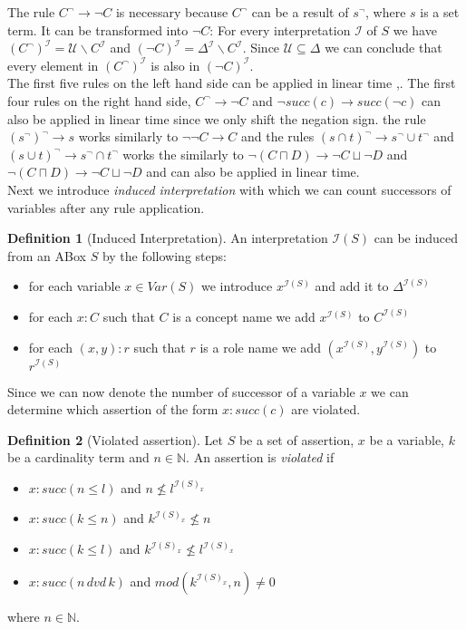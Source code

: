 \documentclass[a4paper,11pt]{scrartcl}
\theoremstyle{break}
\theoremstyle{definition}
\newtheorem{mydef}{Definition}
\begin{document}
The rule $C^\neg\rightarrow \neg C$ is necessary because $C^\neg$ can be a result of $s^\neg$, where $s$ is a set term. It can be transformed into $\neg C$: For every interpretation $\mathcal{I}$ of $S$ we have $(C^\neg)^\mathcal{I}=\mathcal{U}\backslash C^\mathcal{I}$ and $(\neg C)^\mathcal{I}=\Delta^\mathcal{I}\backslash C^\mathcal{I}$. Since $\mathcal{U}\subseteq \Delta$ we can conclude that every element in $(C^\neg)^\mathcal{I}$ is also in $(\neg C)^\mathcal{I}$.\\
The first five rules on the left hand side can be applied in linear time \cite{1},\cite{6}. The first four rules on the right hand side, $C^\neg\rightarrow \neg C$ and $\neg succ(c)\rightarrow succ(\neg c)$ can also be applied in linear time since we only shift the negation sign. the rule $(s^\neg)^\neg\rightarrow s$ works similarly to $\neg\neg C\rightarrow C$ and the rules $(s\cap t)^\neg\rightarrow s^\neg\cup t^\neg$ and $(s\cup t)^\neg\rightarrow s^\neg \cap t^\neg$ works the similarly to $\neg(C\sqcap D)\rightarrow \neg C\sqcup \neg D$ and $\neg(C\sqcap D)\rightarrow \neg C\sqcup \neg D$ and can also be applied in linear time.\\
Next we introduce \textit{induced interpretation} with which we can count successors of variables after any rule application.
\begin{mydef}[Induced Interpretation]
An interpretation $\mathcal{I}(S)$ can be induced from an ABox $S$ by the following steps:
\begin{itemize}
\item for each variable $x\in Var(S)$ we introduce $x^{\mathcal{I}(S)}$ and add it to $\Delta^{\mathcal{I}(S)}$
\item for each $x:C$ such that $C$ is a concept name we add $x^{\mathcal{I}(S)}$ to $C^{\mathcal{I}(S)}$
\item for each $(x,y):r$ such that $r$ is a role name we add $(x^{\mathcal{I}(S)},y^{\mathcal{I}(S)})$ to $r^{\mathcal{I}(S)}$
\end{itemize}
\end{mydef}
Since we can now denote the number of successor of a variable $x$ we can determine which assertion of the form $x:succ(c)$ are violated.
\begin{mydef}[Violated assertion]
Let $S$ be a set of assertion, $x$ be a variable, $k$ be a cardinality term and $n\in\mathbb{N}$. An assertion is \textit{violated} if
\begin{itemize}
\item $x:succ(n\leq l)$ and $n\not\leq l^{\mathcal{I}(S)_x}$
\item $x:succ(k\leq n)$ and $k^{\mathcal{I}(S)_x}\not\leq n$
\item $x:succ(k\leq l)$ and $k^{\mathcal{I}(S)_x}\not\leq l^{\mathcal{I}(S)_x}$
\item $x:succ(n\,dvd\,k)$ and $mod(k^{\mathcal{I}(S)_x},n)\neq 0$
\end{itemize} 
where $n\in\mathbb{N}$.
\end{mydef}
\end{document}
